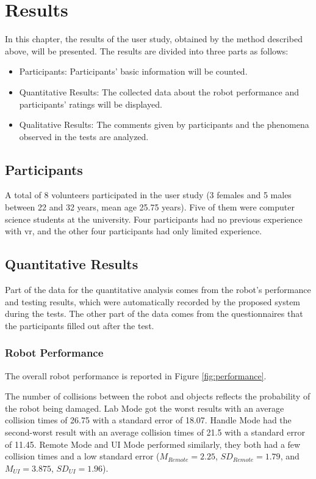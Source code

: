 \chapter{Results}
\label{result}
In this chapter, the results of the user study, obtained by the method described above, will be presented. The results are divided into three parts as follows:

\begin{itemize}
\item Participants: Participants' basic information will be counted.
\item Quantitative Results: The collected data about the robot performance and participants' ratings will be displayed.
\item Qualitative Results: The comments given by participants and the phenomena observed in the tests are analyzed.
\end{itemize}


\section{Participants}

A total of 8 volunteers participated in the user study (3 females and 5 males between 22 and 32 years, mean age 25.75 years). Five of them were computer science students at the university. Four participants had no previous experience with \gls{vr}, and the other four participants had only limited experience.

\section{Quantitative Results}
Part of the data for the quantitative analysis comes from the robot's performance and testing results, which were automatically recorded by the proposed system during the tests. The other part of the data comes from the questionnaires that the participants filled out after the test.

\subsection{Robot Performance}
The overall robot performance is reported in Figure \ref{fig:performance}.

The number of collisions between the robot and objects reflects the probability of the robot being damaged. Lab Mode got the worst results with an average collision times of 26.75 with a standard error of 18.07. Handle Mode had the second-worst result with an average collision times of 21.5 with a standard error of 11.45. Remote Mode and UI Mode performed similarly, they both had a few collision times and a low standard error ($M_{Remote} = 2.25$, $SD_{Remote}= 1.79$, and $M_{UI} = 3.875$, $SD_{UI} = 1.96$). 

